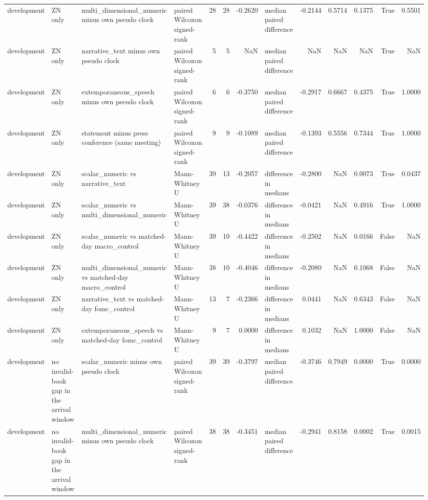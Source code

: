 \begin{tabular}{llllrrrlrrrrr}
development & ZN only & multi_dimensional_numeric minus own pseudo clock & paired Wilcoxon signed-rank & 28 & 28 & -0.2620 & median paired difference & -0.2144 & 0.5714 & 0.1375 & True & 0.5501 \\
development & ZN only & narrative_text minus own pseudo clock & paired Wilcoxon signed-rank & 5 & 5 & NaN & median paired difference & NaN & NaN & NaN & True & NaN \\
development & ZN only & extemporaneous_speech minus own pseudo clock & paired Wilcoxon signed-rank & 6 & 6 & -0.3750 & median paired difference & -0.2917 & 0.6667 & 0.4375 & True & 1.0000 \\
development & ZN only & statement minus press conference (same meeting) & paired Wilcoxon signed-rank & 9 & 9 & -0.1089 & median paired difference & -0.1393 & 0.5556 & 0.7344 & True & 1.0000 \\
development & ZN only & scalar_numeric vs narrative_text & Mann-Whitney U & 39 & 13 & -0.2057 & difference in medians & -0.2800 & NaN & 0.0073 & True & 0.0437 \\
development & ZN only & scalar_numeric vs multi_dimensional_numeric & Mann-Whitney U & 39 & 38 & -0.0376 & difference in medians & -0.0421 & NaN & 0.4916 & True & 1.0000 \\
development & ZN only & scalar_numeric vs matched-day macro_control & Mann-Whitney U & 39 & 10 & -0.4422 & difference in medians & -0.2502 & NaN & 0.0166 & False & NaN \\
development & ZN only & multi_dimensional_numeric vs matched-day macro_control & Mann-Whitney U & 38 & 10 & -0.4046 & difference in medians & -0.2080 & NaN & 0.1068 & False & NaN \\
development & ZN only & narrative_text vs matched-day fomc_control & Mann-Whitney U & 13 & 7 & -0.2366 & difference in medians & 0.0441 & NaN & 0.6343 & False & NaN \\
development & ZN only & extemporaneous_speech vs matched-day fomc_control & Mann-Whitney U & 9 & 7 & 0.0000 & difference in medians & 0.1032 & NaN & 1.0000 & False & NaN \\
development & no invalid-book gap in the arrival window & scalar_numeric minus own pseudo clock & paired Wilcoxon signed-rank & 39 & 39 & -0.3797 & median paired difference & -0.3746 & 0.7949 & 0.0000 & True & 0.0000 \\
development & no invalid-book gap in the arrival window & multi_dimensional_numeric minus own pseudo clock & paired Wilcoxon signed-rank & 38 & 38 & -0.3451 & median paired difference & -0.2941 & 0.8158 & 0.0002 & True & 0.0015 \\

\end{tabular}
